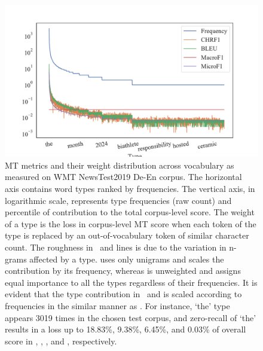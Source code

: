 \begin{figure}[ht]
  \includegraphics[width=0.75\linewidth,trim={15mm 5mm 25mm 15mm},clip]{img/bleu-chrf-macro-micro-swapin-lenmatch.pdf}
  \caption{MT metrics and their weight distribution across vocabulary as measured on WMT NewsTest2019 De-En corpus.
    The horizontal axis contains word types ranked by frequencies.
     The vertical axis, in logarithmic scale, represents type frequencies (raw count) and percentile of contribution to the total corpus-level score. 
    The weight of a type is the loss in corpus-level MT score when each token of the type is replaced by an out-of-vocabulary token of similar character count.
     The roughness in \bleu\ and  lines is due to the variation in n-grams affected by a type.
      uses only unigrams and scales the contribution by its frequency, whereas
      is unweighted and assigns equal importance to all the types regardless of their frequencies. 
   It is evident that the type contribution in \bleu\ and  is scaled according to frequencies in the similar manner as .
    For instance, `the' type appears 3019 times in the chosen test corpus, and zero-recall of `the' results in a loss up to 18.83\%, 9.38\%, 6.45\%, and 0.03\% of overall score in \bleu, , , and , respectively.}
  \label{fig:bleu-damage}
\end{figure}



